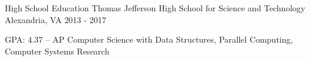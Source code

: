 \begin{cventries}
  \cventry
    {High School Education}
    {Thomas Jefferson High School for Science and Technology}
    {Alexandria, VA}
    {2013 - 2017}
    {
      \begin{cvitems}
		\item {GPA: 4.37 -- AP Computer Science with Data Structures, Parallel Computing, Computer Systems Research}
      \end{cvitems}
    }
	\vspace{-1.0em}
\end{cventries}
